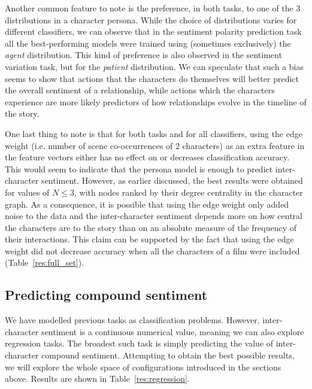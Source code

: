 \documentclass[bsc,frontabs,singlespacing,parskip, twoside]{infthesis}
\begin{document}
Another common feature to note is the preference, in both tasks, to one of the 3 distributions in a character persona. While the choice of distributions varies for different classifiers, we can observe that in the sentiment polarity prediction task all the best-performing models were trained using (sometimes exclusively) the \textit{agent} distribution. This kind of preference is also observed in the sentiment variation task, but for the \textit{patient} distribution. We can speculate that such a bias seems to show that actions that the characters do themselves will better predict the overall sentiment of a relationship, while actions which the characters experience are more likely predictors of how relationships evolve in the timeline of the story.

One last thing to note is that for both tasks and for all classifiers, using the edge weight (i.e. number of scene co-occurrences of 2 characters) as an extra feature in the feature vectors either has no effect on or decreases classification accuracy. This would seem to indicate that the persona model is enough to predict inter-character sentiment. However, as earlier discussed, the best results were obtained for values of $N \le 3$, with nodes ranked by their degree centrality in the character graph. As a consequence, it is possible that using the edge weight only added noise to the data and the inter-character sentiment depends more on how central the characters are to the story than on an absolute measure of the frequency of their interactions. This claim can be supported by the fact that using the edge weight did not decrease accuracy when all the characters of a film were included (Table~\ref{res:full_set}).

\subsection{Predicting compound sentiment}
We have modelled previous tasks as classification problems. However, inter-character sentiment is a continuous numerical value, meaning we can also explore regression tasks. The broadest such task is simply predicting the value of inter-character compound sentiment. Attempting to obtain the best possible results, we will explore the whole space of configurations introduced in the sections above. Results are shown in Table~\ref{res:regression}. 
\end{document}
